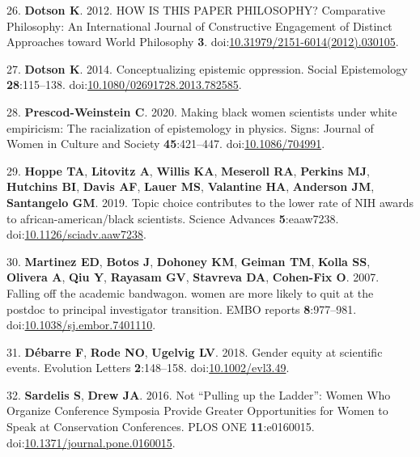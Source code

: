 \documentclass[11pt,]{article}
\begin{document}
\hypertarget{ref-Dotson2012}{}
26. \textbf{Dotson K}. 2012. HOW IS THIS PAPER PHILOSOPHY? Comparative
Philosophy: An International Journal of Constructive Engagement of
Distinct Approaches toward World Philosophy \textbf{3}.
doi:\href{https://doi.org/10.31979/2151-6014(2012).030105}{10.31979/2151-6014(2012).030105}.

\hypertarget{ref-Dotson2014}{}
27. \textbf{Dotson K}. 2014. Conceptualizing epistemic oppression.
Social Epistemology \textbf{28}:115--138.
doi:\href{https://doi.org/10.1080/02691728.2013.782585}{10.1080/02691728.2013.782585}.

\hypertarget{ref-PrescodWeinstein2020}{}
28. \textbf{Prescod-Weinstein C}. 2020. Making black women scientists
under white empiricism: The racialization of epistemology in physics.
Signs: Journal of Women in Culture and Society \textbf{45}:421--447.
doi:\href{https://doi.org/10.1086/704991}{10.1086/704991}.

\hypertarget{ref-Hoppe2019}{}
29. \textbf{Hoppe TA}, \textbf{Litovitz A}, \textbf{Willis KA},
\textbf{Meseroll RA}, \textbf{Perkins MJ}, \textbf{Hutchins BI},
\textbf{Davis AF}, \textbf{Lauer MS}, \textbf{Valantine HA},
\textbf{Anderson JM}, \textbf{Santangelo GM}. 2019. Topic choice
contributes to the lower rate of NIH awards to african-american/black
scientists. Science Advances \textbf{5}:eaaw7238.
doi:\href{https://doi.org/10.1126/sciadv.aaw7238}{10.1126/sciadv.aaw7238}.

\hypertarget{ref-Martinez2007}{}
30. \textbf{Martinez ED}, \textbf{Botos J}, \textbf{Dohoney KM},
\textbf{Geiman TM}, \textbf{Kolla SS}, \textbf{Olivera A}, \textbf{Qiu
Y}, \textbf{Rayasam GV}, \textbf{Stavreva DA}, \textbf{Cohen-Fix O}.
2007. Falling off the academic bandwagon. women are more likely to quit
at the postdoc to principal investigator transition. EMBO reports
\textbf{8}:977--981.
doi:\href{https://doi.org/10.1038/sj.embor.7401110}{10.1038/sj.embor.7401110}.

\hypertarget{ref-debarre_gender_2018}{}
31. \textbf{Débarre F}, \textbf{Rode NO}, \textbf{Ugelvig LV}. 2018.
Gender equity at scientific events. Evolution Letters
\textbf{2}:148--158.
doi:\href{https://doi.org/10.1002/evl3.49}{10.1002/evl3.49}.

\hypertarget{ref-sardelis_not_2016}{}
32. \textbf{Sardelis S}, \textbf{Drew JA}. 2016. Not ``Pulling up the
Ladder'': Women Who Organize Conference Symposia Provide Greater
Opportunities for Women to Speak at Conservation Conferences. PLOS ONE
\textbf{11}:e0160015.
doi:\href{https://doi.org/10.1371/journal.pone.0160015}{10.1371/journal.pone.0160015}.
\end{document}
